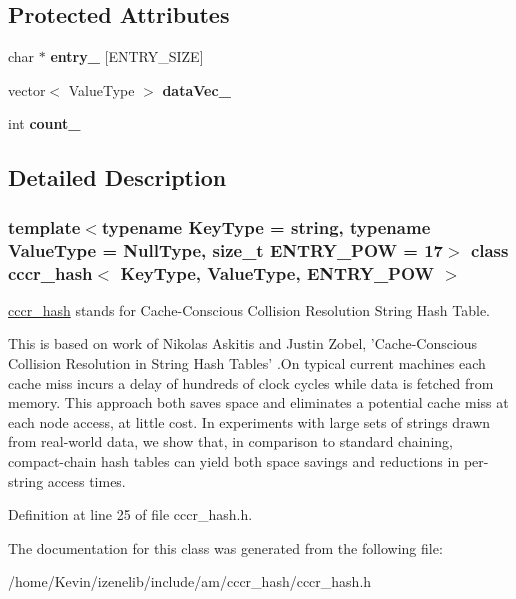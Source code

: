 \subsection*{Protected Attributes}
\begin{CompactItemize}
\item 
\hypertarget{classcccr__hash_bf34bf6bad9aa74a116546db8f584e43}{
char $\ast$ \textbf{entry\_\-} \mbox{[}ENTRY\_\-SIZE\mbox{]}}
\label{classcccr__hash_bf34bf6bad9aa74a116546db8f584e43}

\item 
\hypertarget{classcccr__hash_0e00a47602fb75b10ad2ffa93a98d53c}{
vector$<$ ValueType $>$ \textbf{dataVec\_\-}}
\label{classcccr__hash_0e00a47602fb75b10ad2ffa93a98d53c}

\item 
\hypertarget{classcccr__hash_bd2b6a257b9ca60385d9373a49b42a04}{
int \textbf{count\_\-}}
\label{classcccr__hash_bd2b6a257b9ca60385d9373a49b42a04}

\end{CompactItemize}


\subsection{Detailed Description}
\subsubsection*{template$<$typename KeyType = string, typename ValueType = NullType, size\_\-t ENTRY\_\-POW = 17$>$ class cccr\_\-hash$<$ KeyType, ValueType, ENTRY\_\-POW $>$}

\hyperlink{classcccr__hash}{cccr\_\-hash} stands for Cache-Conscious Collision Resolution String Hash Table. 

This is based on work of Nikolas Askitis and Justin Zobel, 'Cache-Conscious Collision Resolution in String Hash Tables' .On typical current machines each cache miss incurs a delay of hundreds of clock cycles while data is fetched from memory. This approach both saves space and eliminates a potential cache miss at each node access, at little cost. In experiments with large sets of strings drawn from real-world data, we show that, in comparison to standard chaining, compact-chain hash tables can yield both space savings and reductions in per-string access times. 

Definition at line 25 of file cccr\_\-hash.h.

The documentation for this class was generated from the following file:\begin{CompactItemize}
\item 
/home/Kevin/izenelib/include/am/cccr\_\-hash/cccr\_\-hash.h\end{CompactItemize}
